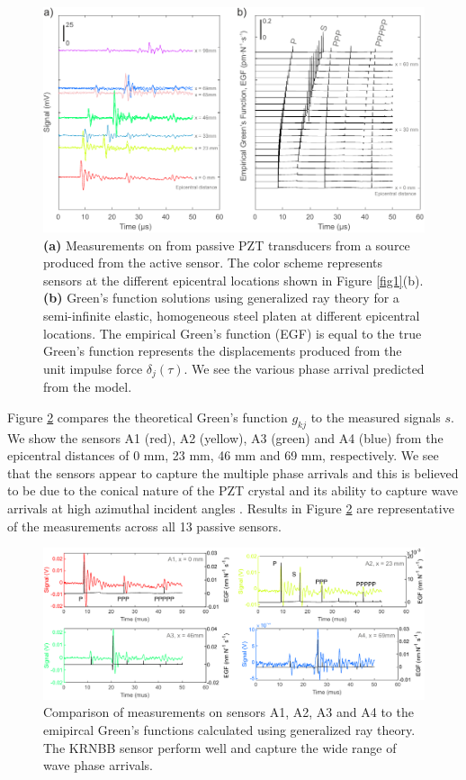 \documentclass[preprint,3p, 11pt,authoryear]{elsarticle}
\begin{document}
\begin{figure}[ht]
     	\centering
\includegraphics[scale= 1.0]{FIG3.pdf} 
\caption{\textbf{(a)} Measurements on from passive PZT transducers from a source produced from the active sensor. The color scheme represents sensors at the different epicentral locations shown in Figure \ref{fig1}(b).  \textbf{(b)} Green's function solutions using generalized ray theory for a semi-infinite elastic, homogeneous steel platen at different epicentral locations.  The empirical Green's function (EGF) is equal to the true Green's function represents the displacements produced from the unit impulse force $\delta_{j}(\tau)$. We see the various phase arrival predicted from the model.}
	\label{fig3} 
\end{figure}

Figure \ref{fig4} compares the theoretical Green's function $g_{kj}$ to the measured signals $s$.  We show the sensors A1 (red), A2 (yellow), A3 (green) and A4 (blue) from the epicentral distances of 0 mm, 23 mm, 46 mm and 69 mm, respectively. We see that the sensors appear to capture the multiple phase arrivals and this is believed to be due to the conical nature of the PZT crystal and its ability to capture wave arrivals at high azimuthal incident angles \citep{Selvadurai2019}. Results in Figure \ref{fig4} are representative of the measurements across all 13 passive sensors.

\begin{figure}[ht]
     	\centering
\includegraphics[scale= 0.90]{FIG4.pdf} 
\caption{Comparison of measurements on sensors A1, A2, A3 and A4 to the emipircal Green's functions calculated using generalized ray theory. The KRNBB sensor perform well and capture the wide range of wave phase arrivals.}
	\label{fig4} 
\end{figure}
\end{document}
